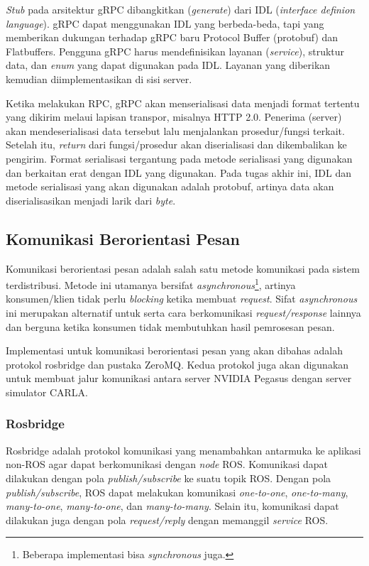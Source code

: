 \textit{Stub} pada arsitektur gRPC dibangkitkan (\textit{generate}) dari IDL
(\textit{interface definion language}). gRPC dapat menggunakan IDL yang
berbeda-beda, tapi yang memberikan dukungan terhadap gRPC baru Protocol Buffer
(protobuf) dan Flatbuffers. Pengguna gRPC harus mendefinisikan layanan
(\textit{service}), struktur data, dan \textit{enum} yang dapat digunakan pada
IDL. Layanan yang diberikan kemudian diimplementasikan di sisi server.

Ketika melakukan RPC, gRPC akan menserialisasi data menjadi format tertentu yang
dikirim melaui lapisan transpor, misalnya HTTP 2.0. Penerima (server) akan
mendeserialisasi data tersebut lalu menjalankan prosedur/fungsi terkait. Setelah
itu, \textit{return} dari fungsi/prosedur akan diserialisasi dan dikembalikan ke
pengirim. Format serialisasi tergantung pada metode serialisasi yang digunakan
dan berkaitan erat dengan IDL yang digunakan. Pada tugas akhir ini, IDL dan metode
serialisasi yang akan digunakan adalah protobuf, artinya data akan
diserialisasikan menjadi larik dari \textit{byte}.

\subsection{Komunikasi Berorientasi Pesan}

Komunikasi berorientasi pesan adalah salah satu metode komunikasi pada sistem
terdistribusi. Metode ini utamanya bersifat
\textit{asynchronous}\footnote{Beberapa implementasi bisa \textit{synchronous}
	juga.}, artinya konsumen/klien tidak perlu \textit{blocking} ketika membuat
\textit{request}. Sifat \textit{asynchronous} ini merupakan alternatif untuk
serta cara berkomunikasi \textit{request/response} lainnya dan berguna ketika
konsumen tidak membutuhkan hasil pemrosesan pesan.

Implementasi untuk komunikasi berorientasi pesan yang akan dibahas adalah
protokol rosbridge dan pustaka ZeroMQ. Kedua protokol juga akan digunakan untuk
membuat jalur komunikasi antara server NVIDIA Pegasus dengan server simulator
CARLA.

\subsubsection{Rosbridge}

Rosbridge adalah protokol komunikasi yang menambahkan antarmuka ke aplika\-si
non-ROS agar dapat berkomunikasi dengan \textit{node} ROS. Komunikasi dapat
dilakukan dengan pola \textit{publish/subscribe} ke suatu topik ROS. Dengan pola
\textit{publish/subscribe}, ROS dapat melakukan komunikasi \textit{one-to-one},
\textit{one-to-many}, \textit{many-to-one}, \textit{many-to-one}, dan
\textit{many-to-many}. Selain itu, komunikasi dapat dilakukan juga dengan pola
\textit{request/reply} dengan memanggil \textit{service} ROS.

